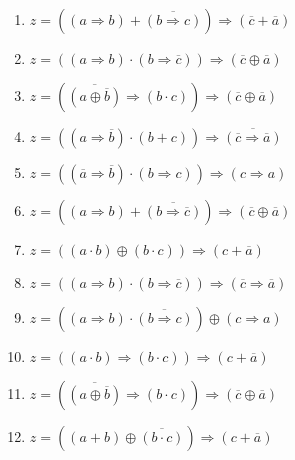 \documentclass[11pt,a4paper]{article}
\begin{document}
\noindent\begin{minipage}[t]{7cm}
\begin{enumerate}  
\item $z = ((a \Rightarrow b) + \overline{(b \Rightarrow c)}) \Rightarrow (\overline{c} + \overline{a})$ 
\item $z = ((a \Rightarrow b) \cdot (b \Rightarrow \overline{c})) \Rightarrow (\overline{c} \oplus \overline{a})$
\item $z = (\overline{(a \oplus \overline{b})} \Rightarrow (b \cdot c)) \Rightarrow (\overline{c} \oplus \overline{a})$
\item $z = ((a \Rightarrow \overline{b}) \cdot (b + c)) \Rightarrow \overline{(\overline{c} \Rightarrow \overline{a})}$
\item $z = ((\overline{a} \Rightarrow \overline{b}) \cdot (b \Rightarrow c)) \Rightarrow ({c} \Rightarrow {a})$
\item $z = ({(a \Rightarrow b)} + \overline{(b \Rightarrow \overline{c})}) \Rightarrow (\overline{c} \oplus \overline{a})$ 
\item $z = ((a \cdot b) \oplus (b \cdot c)) \Rightarrow ({c} + \overline{a})$
\item $z = ((a \Rightarrow b) \cdot (b \Rightarrow \overline{c})) \Rightarrow (\overline{c} \Rightarrow \overline{a})$
\item $z = (({a} \Rightarrow {b}) \cdot \overline{(b \Rightarrow c)}) \oplus ({c} \Rightarrow {a})$
\item $z = ((a \cdot b) \Rightarrow (b \cdot c)) \Rightarrow ({c} + \overline{a})$
\item $z = (\overline{(a \oplus \overline{b})} \Rightarrow (b \cdot c)) \Rightarrow (\overline{c} \oplus \overline{a})$
\item $z = ({(a + b)} \oplus \overline{(b \cdot c)}) \Rightarrow ({c} + \overline{a})$
\end{enumerate}
\end{minipage}
\hfill
\end{document}
